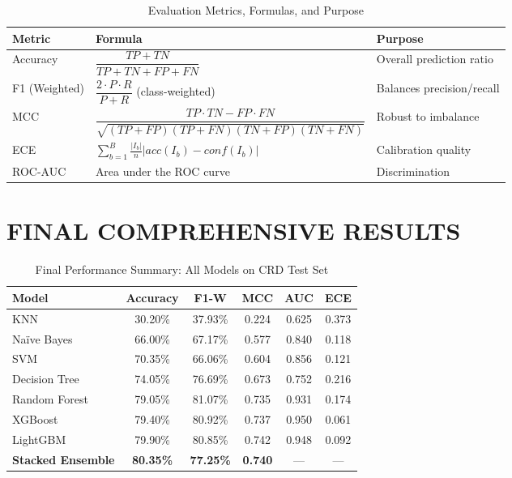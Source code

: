 \documentclass[12pt,a4paper,oneside]{report}
\begin{document}
\begin{table}[H]
\centering
\caption{Evaluation Metrics, Formulas, and Purpose}
\label{tab:metrics_full}
\renewcommand{\arraystretch}{2.0}
\begin{tabular}{p{2.2cm} p{7.5cm} p{3.5cm}}
\toprule
\textbf{Metric} & \textbf{Formula} & \textbf{Purpose} \\
\midrule
Accuracy      & $\dfrac{TP + TN}{TP + TN + FP + FN}$ & Overall prediction ratio \\
F1 (Weighted) & $\dfrac{2 \cdot P \cdot R}{P + R}$ (class-weighted) & Balances precision/recall \\
MCC           & $\dfrac{TP \cdot TN - FP \cdot FN}{\sqrt{(TP+FP)(TP+FN)(TN+FP)(TN+FN)}}$ & Robust to imbalance \\
ECE           & $\displaystyle\sum_{b=1}^{B} \frac{|I_b|}{n}\left|acc(I_b) - conf(I_b)\right|$ & Calibration quality \\
ROC-AUC       & Area under the ROC curve & Discrimination \\
\bottomrule
\end{tabular}
\end{table}

\section{FINAL COMPREHENSIVE RESULTS}

\begin{table}[H]
\centering
\caption{Final Performance Summary: All Models on CRD Test Set}
\label{tab:final_results}
\renewcommand{\arraystretch}{1.4}
\begin{tabular}{p{3.5cm} c c c c c}
\toprule
\textbf{Model} & \textbf{Accuracy} & \textbf{F1-W} & \textbf{MCC} & \textbf{AUC} & \textbf{ECE} \\
\midrule
KNN             & 30.20\% & 37.93\% & 0.224 & 0.625 & 0.373 \\
Na\"{i}ve Bayes & 66.00\% & 67.17\% & 0.577 & 0.840 & 0.118 \\
SVM             & 70.35\% & 66.06\% & 0.604 & 0.856 & 0.121 \\
Decision Tree   & 74.05\% & 76.69\% & 0.673 & 0.752 & 0.216 \\
Random Forest   & 79.05\% & 81.07\% & 0.735 & 0.931 & 0.174 \\
XGBoost         & 79.40\% & 80.92\% & 0.737 & 0.950 & 0.061 \\
LightGBM        & 79.90\% & 80.85\% & 0.742 & 0.948 & 0.092 \\
\midrule
\textbf{Stacked Ensemble} & \textbf{80.35\%} & \textbf{77.25\%} & \textbf{0.740} & --- & --- \\
\bottomrule
\end{tabular}
\end{table}
\end{document}
